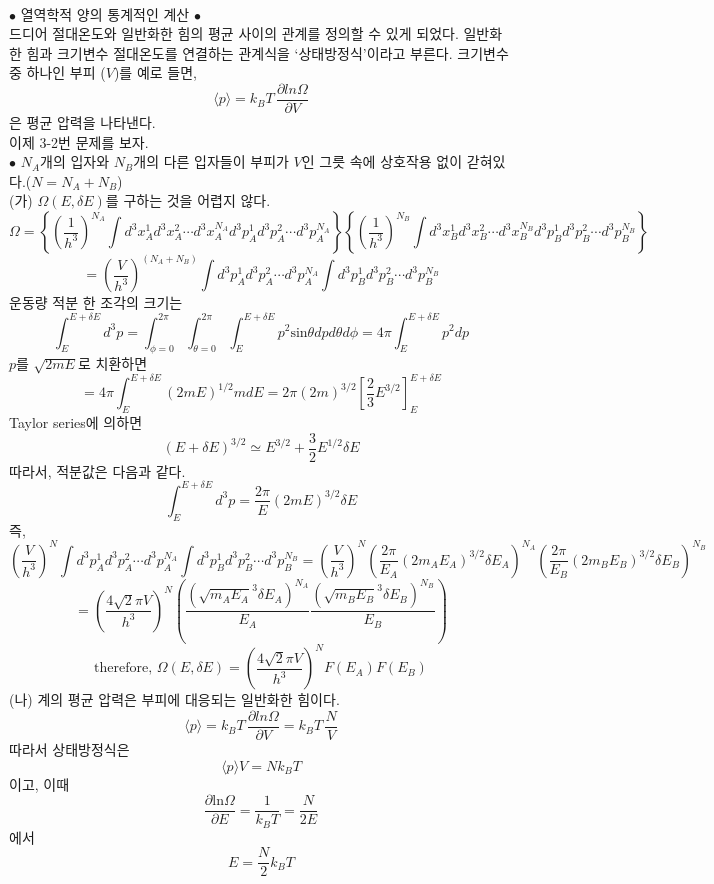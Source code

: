 \documentclass[a4paper,12pt]{article}
\begin{document}
\paragraph{}
$\bullet$ 열역학적 양의 통계적인 계산 $\bullet$\\
드디어 절대온도와 일반화한 힘의 평균 사이의 관계를 정의할 수 있게 되었다. 일반화한 힘과 크기변수 절대온도를 연결하는 관계식을 `상태방정식'이라고 부른다. 크기변수 중 하나인 부피 ($V$)를 예로 들면,
$$\langle p \rangle={k_B T}\,\frac{\partial ln \Omega}{\partial V}$$은 평균 압력을 나타낸다. \\
이제 3-2번 문제를 보자.\\ $\bullet$ $N_A$개의 입자와 $N_B$개의 다른 입자들이 부피가 $V$인 그릇 속에 상호작용 없이 갇혀있다.($ N=N_A+N_B$) \\
(가) $\Omega(E,\delta E)$를 구하는 것을 어렵지 않다. 
$$\Omega=\left\lbrace \left(\frac{1}{h^3} \right)^{N_A} \int d^3x^{1}_{A}d^3x^{2}_{A}\cdots d^3x^{N_A}_{A}d^3p^{1}_{A}d^3p^{2}_{A}\cdots d^3p^{N_A}_{A}  \right\rbrace \left\lbrace\left(\frac{1}{h^3} \right)^{N_B} \int d^3x^{1}_{B}d^3x^{2}_{B}\cdots d^3x^{N_B}_{B}d^3p^{1}_{B}d^3p^{2}_{B}\cdots d^3p^{N_B}_{B} \right\rbrace$$ 
$$=\left(\frac{V}{h^3} \right)^{(N_A+N_B)}\int d^3p^{1}_{A}d^3p^{2}_{A}\cdots d^3p^{N_A}_{A}\int d^3p^{1}_{B}d^3p^{2}_{B}\cdots d^3p^{N_B}_{B} $$
운동량 적분 한 조각의 크기는 
$$\int_{E}^{E+\delta E}d^3p=\int_{\phi=0}^{2\pi}\int_{\theta=0}^{2\pi}\int_{E}^{E+\delta E} p^2 \mbox{sin} \theta dpd\theta d\phi=4\pi\int_{E}^{E+\delta E}p^2dp$$
$p$를 $\sqrt{2mE}$로 치환하면 
$$=4\pi\int_{E}^{E+\delta E}(2mE)^{1/2}mdE=2\pi(2m)^{3/2}\left[ \frac{2}{3}E^{3/2}\right]_{E}^{E+\delta E} $$
Taylor series에 의하면 
$$(E+\delta E)^{3/2}\simeq E^{3/2}+\frac{3}{2}E^{1/2}\delta E$$
따라서, 적분값은 다음과 같다. 
$$\int_{E}^{E+\delta E}d^3p=\frac{2\pi}{E}(2mE)^{3/2}\delta E$$
즉,
$$\left(\frac{V}{h^3} \right)^{N}\int d^3p^{1}_{A}d^3p^{2}_{A}\cdots d^3p^{N_A}_{A}\int d^3p^{1}_{B}d^3p^{2}_{B}\cdots d^3p^{N_B}_{B}=\left(\frac{V}{h^3} \right)^{N}\left(\frac{2\pi}{E_A}(2m_A E_A)^{3/2}\delta E_A \right)^{N_A}\left(\frac{2\pi}{E_B}(2m_B E_B)^{3/2}\delta E_B \right)^{N_B} $$
$$=\left(\frac{4\sqrt{2}\pi V}{h^3} \right)^N \left( \frac{(\sqrt{m_AE_A}^3\delta E_A)^{N_A}}{E_A}\frac{(\sqrt{m_BE_B}^3\delta E_B)^{N_B}}{E_B}\right) $$
$$\mbox{therefore, }\Omega(E,\delta E)=\left(\frac{4\sqrt{2}\pi V}{h^3}\right)^NF(E_A)F(E_B)$$
(나) 계의 평균 압력은 부피에 대응되는 일반화한 힘이다. 
$$\langle p \rangle={k_B T}\,\frac{\partial ln \Omega}{\partial V}={k_B T}\,\frac{N}{V}$$
따라서 상태방정식은 
$$\langle p \rangle V=Nk_B T$$
이고, 이때 
$$\frac{\partial \mbox{ln}\Omega}{\partial E}=\frac{1}{k_B T}=\frac{N}{2E}$$ 에서 
$$E=\frac{N}{2}k_B T$$
\end{document}
